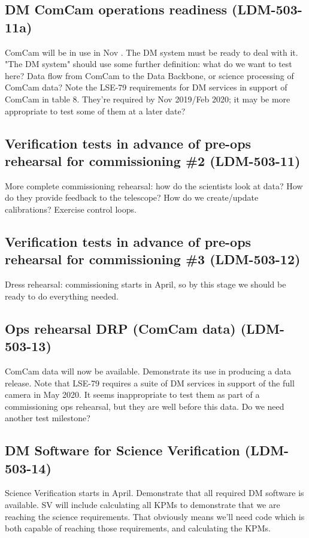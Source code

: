 \subsection{DM ComCam operations readiness \textbf{(LDM-503-11a)}\label{LDM-503-11a}}
ComCam will be in use in Nov . The DM system must be ready to deal with it.
 \newline
"The DM system" should use some further definition: what do we want to test here? Data flow from ComCam to the Data Backbone, or science processing of ComCam data?
 Note the LSE-79 requirements for DM services in support of ComCam in table 8. They're required by Nov 2019/Feb 2020; it may be more appropriate to test some of them at a later date?
\subsection{Verification tests in advance of pre-ops rehearsal for commissioning \#2 \textbf{(LDM-503-11)}\label{LDM-503-11}}
More complete commissioning rehearsal: how do the scientists look at data? How do they provide feedback to the telescope? How do we create/update calibrations?
 Exercise control loops.
 \newline

\subsection{Verification tests in advance of pre-ops rehearsal for commissioning \#3 \textbf{(LDM-503-12)}\label{LDM-503-12}}
Dress rehearsal: commissioning starts in April, so by this stage we should be ready to do everything needed.
 \newline

\subsection{Ops rehearsal DRP (ComCam data) \textbf{(LDM-503-13)}\label{LDM-503-13}}
ComCam data will now be available. Demonstrate its use in producing a data release.
 \newline
Note that LSE-79 requires a suite of DM services in support of the full camera in May 2020. It seems inappropriate to test them as part of a commissioning ops rehearsal, but they are well before this data. Do we need another test milestone?
\subsection{DM Software for Science Verification \textbf{(LDM-503-14)}\label{LDM-503-14}}
Science Verification starts in April. Demonstrate that all required DM software is available.
 \newline
SV will include calculating all KPMs to demonstrate that we are reaching the science requirements. That obviously means we'll need code which is both capable of reaching those requirements, and calculating the KPMs.
